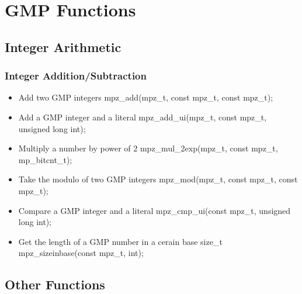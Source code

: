 \section{GMP Functions}


%


\subsection{Integer Arithmetic}

\begin{frame}
\frametitle{Integer Addition/Subtraction}
\begin{itemize}
  \item Add two GMP integers
  mpz_add(mpz_t, const mpz_t, const mpz_t);
  \item Add a GMP integer and a literal
  mpz_add_ui(mpz_t, const mpz_t, unsigned long int);
  \item Multiply a number by power of 2
  mpz_mul_2exp(mpz_t, const mpz_t, mp_bitcnt_t);
  \item Take the modulo of two GMP integers
  mpz_mod(mpz_t, const mpz_t, const mpz_t);
  \item Compare a GMP integer and a literal
  mpz_cmp_ui(const mpz_t, unsigned long int);
  \item Get the length of a GMP number in a cerain base
  size_t mpz_sizeinbase(const mpz_t, int);
\end{itemize}
\end{frame}


\subsection{Other Functions}

